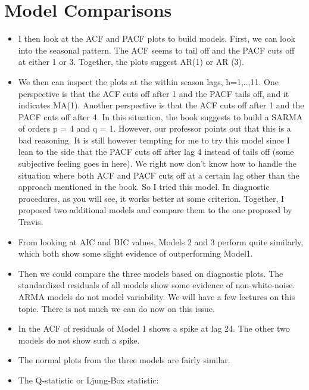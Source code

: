 {    \section*{Model Comparisons}
    
\begin{itemize}
	\item     I then look at the ACF and PACF plots to build models. First, we can look into the seasonal pattern. The ACF seems to tail off and the PACF cuts off at either 1 or 3. Together, the plots suggest AR(1) or AR (3).

\item We then can inspect the plots at the within season lags, h=1,..,11. One perspective is that the ACF cuts off after 1 and the PACF tails off, and it indicates MA(1). Another perspective is that the ACF cuts off after 1 and the PACF cuts off after 4. In this situation, the book suggests to build a SARMA of orders p = 4 and q = 1. However, our professor points out that this is a bad reasoning. It is still however tempting for me to try this model since I lean to the side that the PACF cuts off after lag 4 instead of tails off (some subjective feeling goes in here). We right now don't know how to handle the situation where both ACF and PACF cuts off at a certain lag other than the approach mentioned in the book. So I tried this model. In diagnostic procedures, as you will see, it works better at some criterion. Together, I proposed two additional models and compare them to the one proposed by Travis.

 \item  From looking at AIC and BIC values, Models 2 and 3 perform quite similarly, which both show some slight evidence of outperforming Model1.
  
  \item Then we could compare the three models based on diagnostic plots. The standardized residuals of all models show some evidence of non-white-noise. ARMA models do not model variability. We will have a few lectures on this topic. There is not much we can do now on this issue.
  
 \item  In the ACF of residuals of Model 1 shows a spike at lag 24. The other two models do not show such a spike.
  
  \item The normal plots from the three models are fairly similar.
  
  \item The Q-statistic or Ljung-Box statistic:
  

\end{itemize}}
